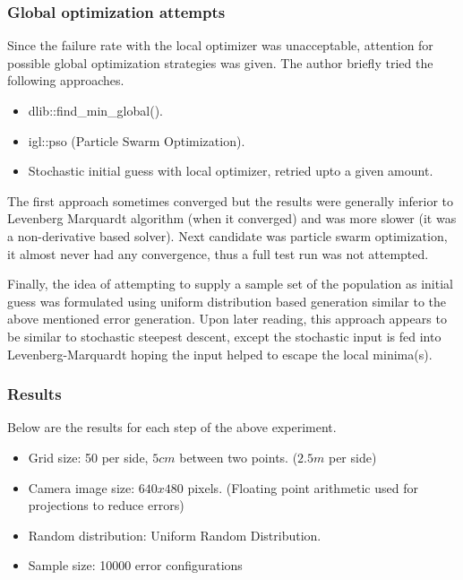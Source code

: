 \documentclass[english, printversion, nomenclature, notitle]{tuvisionthesis} %
\begin{document}
\subsubsection{Global optimization attempts}
Since the failure rate with the local optimizer was unacceptable, attention for possible global optimization strategies was given. The author briefly tried the following approaches.
\begin{itemize}
	\item dlib::find\_min\_global(). 
	\item igl::pso (Particle Swarm Optimization). 
	\item Stochastic initial guess with local optimizer, retried upto a given amount.
\end{itemize}

The first approach sometimes converged but the results were generally inferior to Levenberg Marquardt algorithm (when it converged) and was more slower (it was a non-derivative based solver). Next candidate was particle swarm optimization, it almost never had any convergence, thus a full test run was not attempted.

Finally, the idea of attempting to supply a sample set of the population as initial guess was formulated using uniform distribution based generation similar to the above mentioned error generation. Upon later reading, this approach appears to be similar to stochastic steepest descent, except the stochastic input is fed into Levenberg-Marquardt hoping the input helped to escape the local minima(s). 

\subsubsection{Results}

Below are the results for each step of the above experiment.  

\begin{itemize}
	\item Grid size: 50 per side, $5cm$ between two points. ($2.5m$ per side)
	\item Camera image size: $640 x 480$ pixels. (Floating point arithmetic used for projections to reduce errors)
	\item Random distribution: Uniform Random Distribution.
	\item Sample size: 10000 error configurations
\end{itemize}
\end{document}
